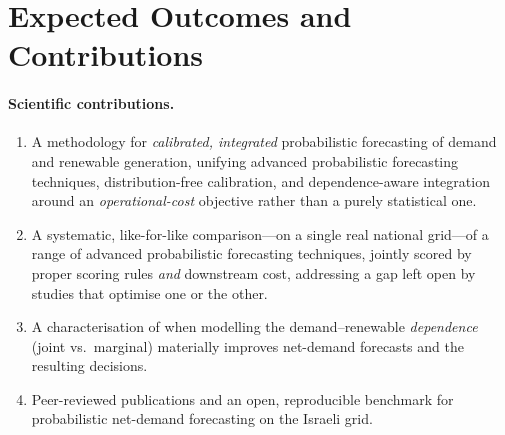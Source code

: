 \documentclass[12pt,a4paper]{article}
\begin{document}
\section{Expected Outcomes and Contributions}
\label{sec:outcomes}

\paragraph{Scientific contributions.}
\begin{enumerate}[leftmargin=1.6em]
    \item A methodology for \emph{calibrated, integrated} probabilistic forecasting of
        demand and renewable generation, unifying advanced probabilistic forecasting
        techniques, distribution-free calibration, and dependence-aware integration around
        an \emph{operational-cost} objective rather than a purely statistical one.
    \item A systematic, like-for-like comparison---on a single real national grid---of a
        range of advanced probabilistic forecasting techniques, jointly scored by proper
        scoring rules \emph{and} downstream cost, addressing a gap left open by studies
        that optimise one or the other.
    \item A characterisation of when modelling the demand--renewable \emph{dependence}
        (joint vs.\ marginal) materially improves net-demand forecasts and the resulting
        decisions.
    \item Peer-reviewed publications and an open, reproducible benchmark for probabilistic
        net-demand forecasting on the Israeli grid.
\end{enumerate}
\end{document}
